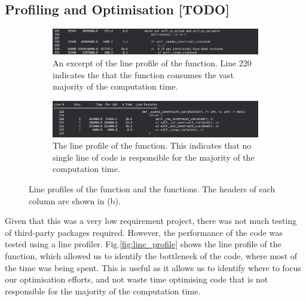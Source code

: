     \subsection{Profiling and Optimisation [TODO]}\label{subsec:profiling-and-optimisation}
    \begin{figure}[htb]
    \centering
    \begin{subfigure}[b]{0.9\linewidth}
        \includegraphics[width=\linewidth]{figures/line_profile1}
        \caption{An excerpt of the line profile of the  function. Line 220 indicates
        the that the  function consumes the vast majority of the
        computation time.}
    \end{subfigure}
    \hfill
    \begin{subfigure}[b]{0.9\linewidth}
        \includegraphics[width=\linewidth]{figures/line_profile2}
        \caption{The line profile of the  function. This indicates
        that no single line of code is responsible for the majority of the computation time.}
    \end{subfigure}
    \caption{Line profiles of the  function and the
     functions. The headers of each column are shown in (b).}
    \label{fig:line_profile}
    \end{figure}
    Given that this was a very low requirement project, there was not much testing of third-party packages required.
    However, the performance of the code was tested using a line profiler.
    Fig.\eqref{fig:line_profile} shows the line profile of the  function, which allowed
    us to identify the bottleneck of the code, where most of the time was being spent.
    This is useful as it allows us to identify where to focus our optimisation efforts, and not waste time optimising
    code that is not responsible for the majority of the computation time.


